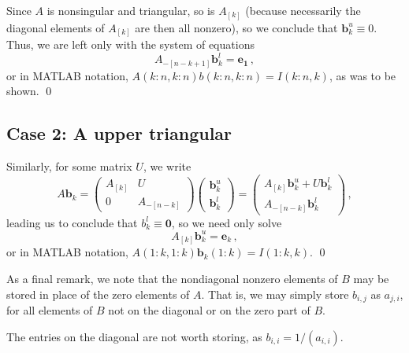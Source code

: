 \documentclass[11pt]{amsart}
\theoremstyle{definition}
\numberwithin{equation}{section}
\begin{document}
Since $A$ is nonsingular and triangular, so is $A_{[k]}$ (because necessarily the diagonal elements of $A_{[k]}$ are then all nonzero), so we conclude that $\mathbf{b}_k^u \equiv 0$. Thus, we are left only with the system of equations
\begin{equation}
A_{-[n-k+1]}\mathbf{b}_k^l = \mathbf{e_1}\,,
\end{equation}
or in MATLAB notation,
$A(k:n, k:n)b(k:n,k:n) = I(k:n,k)$, as was to be shown.
\qed
\subsection*{Case 2: A upper triangular}
Similarly, for some matrix $U$, we write
\begin{equation}
A \mathbf{b}_k= 
\left(
\begin{matrix}
A_{[k]} & U \\
0 & A_{-[n-k]}
\end{matrix}
\right)
\left(
\begin{matrix}
\mathbf{b}_k^u \\
\mathbf{b}_k^l
\end{matrix}
\right)
=
\left(
\begin{matrix}
A_{[k]}\mathbf{b}_k^u + U\mathbf{b}_k^l \\
A_{-[n-k]}\mathbf{b}_k^l
\end{matrix}
\right)
\,,
\end{equation}
leading us to conclude that $b_k^l \equiv \mathbf{0}$, so we need only solve
\begin{equation}
A_{[k]}\mathbf{b}_k^u = \mathbf{e}_k\,,
\end{equation}
or in MATLAB notation,
$A(1:k, 1:k)\mathbf{b}_k(1:k) = I(1:k,k)$.
\qed

As a final remark, we note that the nondiagonal nonzero elements of $B$ may be stored in place of the zero elements of $A$. That is, we may simply store $b_{i,j}$ as $a_{j,i}$, for all elements of $B$ not on the diagonal or on the zero part of $B$.

The entries on the diagonal are not worth storing, as $b_{i,i} = 1/(a_{i,i})$.
\end{document}
